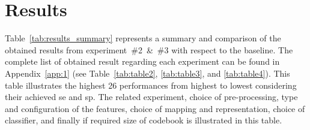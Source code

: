 
%
%

\section{Results}\label{sec:res}
Table~\ref{tab:results_summary} represents a summary and comparison of the obtained results from experiment~\#2~\&~\#3 with respect to the baseline.
The complete list of obtained result regarding each experiment can be found in Appendix~\ref{app:1} (see Table~\ref{tab:table2}, \ref{tab:table3}, and \ref{tab:table4}).
This table illustrates the highest 26 performances from highest to lowest considering their achieved \ac{se} and \ac{sp}.
The related experiment, choice of pre-processing, type and configuration of the features, choice of mapping and representation, choice of classifier, and finally if required size of codebook is illustrated in this table.




